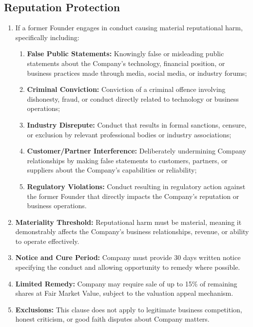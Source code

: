 \subsection{Reputation Protection}
\begin{enumerate}[label=(\alph*)]
\item If a former Founder engages in conduct causing material reputational harm, specifically including:
    \begin{enumerate}[label=(\roman*)]
    \item \textbf{False Public Statements:} Knowingly false or misleading public statements about the Company's technology, financial position, or business practices made through media, social media, or industry forums;
    \item \textbf{Criminal Conviction:} Conviction of a criminal offence involving dishonesty, fraud, or conduct directly related to technology or business operations;
    \item \textbf{Industry Disrepute:} Conduct that results in formal sanctions, censure, or exclusion by relevant professional bodies or industry associations;
    \item \textbf{Customer/Partner Interference:} Deliberately undermining Company relationships by making false statements to customers, partners, or suppliers about the Company's capabilities or reliability;
    \item \textbf{Regulatory Violations:} Conduct resulting in regulatory action against the former Founder that directly impacts the Company's reputation or business operations.
    \end{enumerate}

\item \textbf{Materiality Threshold:} Reputational harm must be material, meaning it demonstrably affects the Company's business relationships, revenue, or ability to operate effectively.

\item \textbf{Notice and Cure Period:} Company must provide 30 days written notice specifying the conduct and allowing opportunity to remedy where possible.

\item \textbf{Limited Remedy:} Company may require sale of up to 15\% of remaining shares at Fair Market Value, subject to the valuation appeal mechanism.

\item \textbf{Exclusions:} This clause does not apply to legitimate business competition, honest criticism, or good faith disputes about Company matters.
\end{enumerate}

